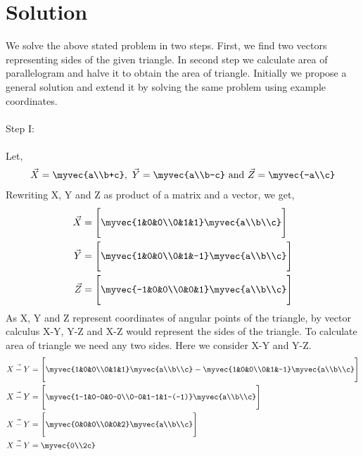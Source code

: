 \documentclass[journal,12pt]{IEEEtran}
\begin{document}
\section{Solution}
We solve the above stated problem in two steps. First, we find two vectors representing sides of the given triangle. In second step we calculate area of parallelogram and halve it to obtain the area of triangle. Initially we propose a general solution and extend it by solving the same problem using example coordinates.\\\\
Step I:\\\\
Let,
\begin{align}
\vec{X} = \myvec{a\\b+c}, \text{ } \vec{Y} = \myvec{a\\b-c} \text{ and } \vec{Z} = \myvec{-a\\c}
\label{eq1}
\end{align}
Rewriting X, Y and Z as product of a matrix and a vector, we get,\\
\begin{align}
\begin{split}
\vec{X} & = \Bigg[\myvec{1&0&0\\0&1&1}\myvec{a\\b\\c}\Bigg] \\
\vec{Y} & = \Bigg[\myvec{1&0&0\\0&1&-1}\myvec{a\\b\\c}\Bigg] \\
\vec{Z} & = \Bigg[\myvec{-1&0&0\\0&0&1}\myvec{a\\b\\c}\Bigg] 
\end{split}
\label{eq2}
\end{align}
As X, Y and Z represent coordinates of angular points of the triangle, by vector calculus X-Y, Y-Z and X-Z would represent the sides of the triangle. To calculate area of triangle we need any two sides. Here we consider X-Y and Y-Z.\\
\begin{align}
\vec{X-Y} & = \Bigg[\myvec{1&0&0\\0&1&1}\myvec{a\\b\\c} - \myvec{1&0&0\\0&1&-1}\myvec{a\\b\\c}\Bigg] \\
\vec{X-Y} & = \Bigg[\myvec{1-1&0-0&0-0\\0-0&1-1&1-(-1)}\myvec{a\\b\\c}\Bigg] \\
\vec{X-Y} & = \Bigg[\myvec{0&0&0\\0&0&2}\myvec{a\\b\\c}\Bigg] \\
\vec{X-Y} & = \myvec{0\\2c}
\label{eq3}
\end{align}
\end{document}
